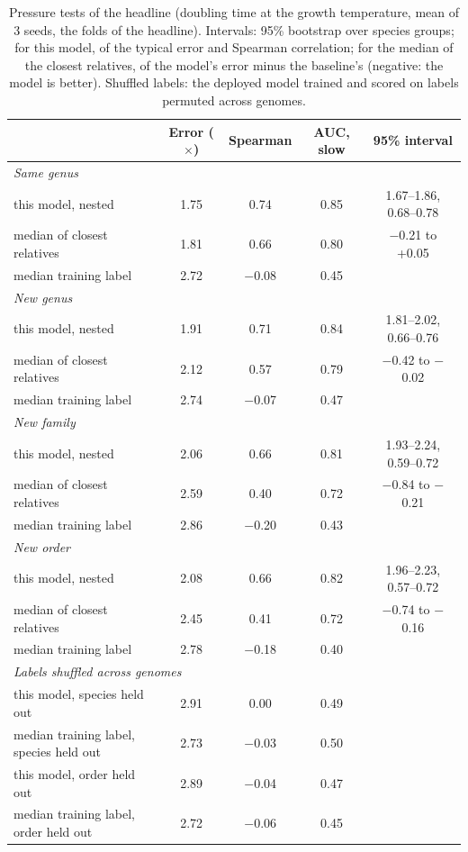 \begin{table}[ht]\centering\small
\caption{Pressure tests of the headline (doubling time at the growth temperature, mean of 3 seeds, the folds of the headline). Intervals: 95\% bootstrap over species groups; for this model, of the typical error and Spearman correlation; for the median of the closest relatives, of the model's error minus the baseline's (negative: the model is better). Shuffled labels: the deployed model trained and scored on labels permuted across genomes.}\label{tab:pressure}
\begin{tabular}{lcccc}
\toprule
& Error ($\times$) & Spearman & AUC, slow & 95\% interval \\
\midrule
\multicolumn{5}{l}{\textit{Same genus}} \\
\quad this model, nested & 1.75 & 0.74 & 0.85 & 1.67--1.86, 0.68--0.78 \\
\quad median of closest relatives & 1.81 & 0.66 & 0.80 & $-$0.21 to +0.05 \\
\quad median training label & 2.72 & $-$0.08 & 0.45 &  \\
\multicolumn{5}{l}{\textit{New genus}} \\
\quad this model, nested & 1.91 & 0.71 & 0.84 & 1.81--2.02, 0.66--0.76 \\
\quad median of closest relatives & 2.12 & 0.57 & 0.79 & $-$0.42 to $-$0.02 \\
\quad median training label & 2.74 & $-$0.07 & 0.47 &  \\
\multicolumn{5}{l}{\textit{New family}} \\
\quad this model, nested & 2.06 & 0.66 & 0.81 & 1.93--2.24, 0.59--0.72 \\
\quad median of closest relatives & 2.59 & 0.40 & 0.72 & $-$0.84 to $-$0.21 \\
\quad median training label & 2.86 & $-$0.20 & 0.43 &  \\
\multicolumn{5}{l}{\textit{New order}} \\
\quad this model, nested & 2.08 & 0.66 & 0.82 & 1.96--2.23, 0.57--0.72 \\
\quad median of closest relatives & 2.45 & 0.41 & 0.72 & $-$0.74 to $-$0.16 \\
\quad median training label & 2.78 & $-$0.18 & 0.40 &  \\
\multicolumn{5}{l}{\textit{Labels shuffled across genomes}} \\
\quad this model, species held out & 2.91 & 0.00 & 0.49 & \\
\quad median training label, species held out & 2.73 & $-$0.03 & 0.50 & \\
\quad this model, order held out & 2.89 & $-$0.04 & 0.47 & \\
\quad median training label, order held out & 2.72 & $-$0.06 & 0.45 & \\
\bottomrule
\end{tabular}
\end{table}

